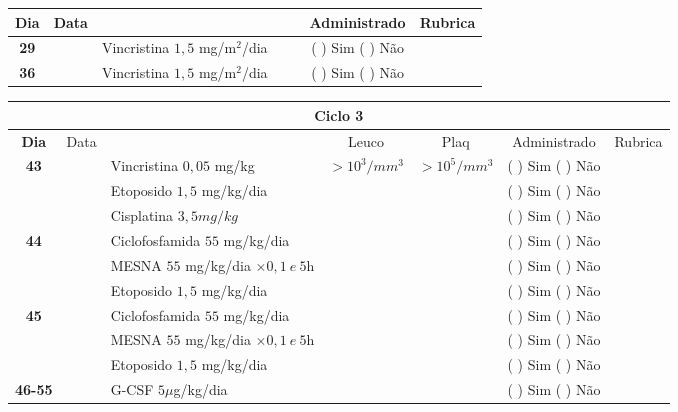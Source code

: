 \documentclass[11pt,a4paper,oldfontcommands]{memoir}
\begin{document}
\begin{center}
\begin{table}[H]
\begin{tabular}{p{1cm}c|p{4.6cm}|p{2cm}p{2cm}|c|c}
	\hline
	\multicolumn{1}{c|}{\multirow{1}{*}{\textbf{Dia}}}&{Data}&{}&{}&&{Administrado}&{Rubrica} \\
    \hline
    \multicolumn{1}{c|}{\textbf{29}}&&{Vincristina \(1,5\) mg/m\(^2\)/dia}&\multicolumn{1}{c}{}&&{(  ) Sim (  ) Não}&\\
    \hline
    \multicolumn{1}{c|}{\textbf{36}}&&{Vincristina \(1,5\) mg/m\(^2\)/dia}&\multicolumn{1}{c}{}&&{(  ) Sim (  ) Não}&\\
    \hline
\end{tabular}
\end{table}
\begin{table}[H] \small
\begin{tabular}{p{1cm}c|p{4.6cm}|p{1.4cm}p{1.4cm}|c|c}
	\hline
	\multicolumn{7}{c}{Ciclo 3} \\
	\hline
	\multicolumn{1}{c|}{\multirow{1}{*}{\textbf{Dia}}}&{Data}&{}&\multicolumn{1}{c|}{Leuco}&\multicolumn{1}{c|}{Plaq}&{Administrado}&{Rubrica} \\
    \hline
    \multicolumn{1}{c|}{\multirow{3}{*}{\textbf{43}}}&&{Vincristina \(0,05\) mg/kg}&\multicolumn{1}{c|}{\(>10^3/mm^3\)}&\multicolumn{1}{c|}{\(>10^5/mm^3\)}&{(  ) Sim (  ) Não}&\\
    \cline{4-5}
    \multicolumn{1}{c|}{}&&{Etoposido \(1,5\) mg/kg/dia}&\multicolumn{1}{c|}{}&&{(  ) Sim (  ) Não}&\\
    \cline{4-5}
    \multicolumn{1}{c|}{}&\multirow{1}{*}{}&{Cisplatina \(3,5mg/kg\)}&&&{(  ) Sim (  ) Não}&\\
    \hline
    \multicolumn{1}{c|}{\multirow{3}{*}{\textbf{44}}}&&{Ciclofosfamida \(55\) mg/kg/dia}&{}&&{(  ) Sim (  ) Não}&\\
    \multicolumn{1}{c|}{}&&{MESNA \(55\) mg/kg/dia \(\times 0,1 \:e\: 5\)h}&&&{(  ) Sim (  ) Não}&\\
    \multicolumn{1}{c|}{}&&{Etoposido \(1,5\) mg/kg/dia}&&&{(  ) Sim (  ) Não}&\\
    \hline
    \multicolumn{1}{c|}{\multirow{3}{*}{\textbf{45}}}&&{Ciclofosfamida \(55\) mg/kg/dia}&{}&&{(  ) Sim (  ) Não}&\\
    \multicolumn{1}{c|}{}&&{MESNA \(55\) mg/kg/dia \(\times 0,1 \:e\: 5\)h}&&&{(  ) Sim (  ) Não}&\\
    \multicolumn{1}{c|}{}&\multirow{1}{*}{}&{Etoposido \(1,5\) mg/kg/dia}&{}&&{(  ) Sim (  ) Não}&\\
    \hline
    \multicolumn{1}{c|}{\textbf{46-55}}&&{G-CSF \(5 \mu\)g/kg/dia }&&&{(  ) Sim (  ) Não}&\\

\end{tabular}
\end{table}
\end{center}
\end{document}
